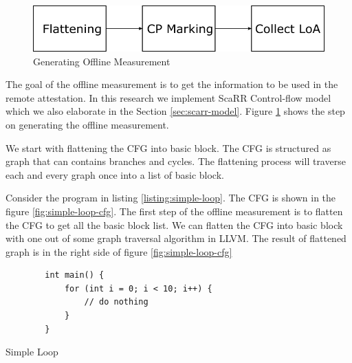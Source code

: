 \begin{figure}[htbp]
\centerline{\includegraphics[scale=.75]{Figures/04/scarr-overview.png}}
\caption{Generating Offline Measurement}
\label{fig:scarr-overview}
\end{figure}

The goal of the offline measurement is to get the information to be used in the 
remote attestation. In this research we implement ScaRR Control-flow model 
\cite{toffaliniScaRRScalableRuntime2019} which we also elaborate in the Section 
\ref{sec:scarr-model}. Figure \ref{fig:scarr-overview} shows the step on generating the offline measurement.

We start with flattening the CFG into basic block. The CFG is structured as graph that can contains branches and cycles. The flattening process will traverse 
each and every graph once into a list of basic block. 

Consider the program in listing \ref{listing:simple-loop}. The CFG is shown in the figure \ref{fig:simple-loop-cfg}. 
The first step of the offline measurement is to flatten the CFG to get all the basic block list. 
We can flatten the CFG into basic block with one out of some graph traversal algorithm in LLVM. The result of flattened
graph is in the right side of figure \ref{fig:simple-loop-cfg}

\begin{listing}[htbp]
    \begin{verbatim}
        int main() {
            for (int i = 0; i < 10; i++) {
                // do nothing
            }
        }
    \end{verbatim}
    \caption{Simple Loop}    
    \label{listing:simple-loop}
\end{listing}

